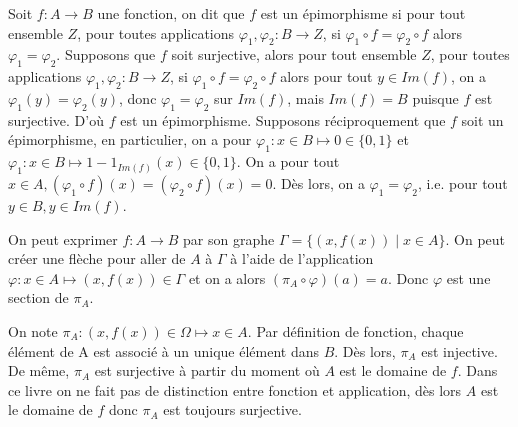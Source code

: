 \begin{exercice}
    Soit $f : A \to B$ une fonction, on dit que $f$ est un épimorphisme si pour tout ensemble $Z$, pour toutes applications $\varphi_1, \varphi_2 : B \to Z$,
    si $\varphi_1 \circ f = \varphi_2 \circ f$ alors $\varphi_1 = \varphi_2$.
    Supposons que $f$ soit surjective, alors pour tout ensemble $Z$, pour toutes applications $\varphi_1, \varphi_2 : B \to Z$, si $\varphi_1 \circ f = \varphi_2 \circ f$ alors 
    pour tout $y \in Im(f)$, on a $\varphi_1(y) = \varphi_2(y)$, donc $\varphi_1 = \varphi_2$ sur $Im(f)$, mais $Im(f) = B$ puisque $f$ est surjective. D'où $f$ est un épimorphisme. 
    Supposons réciproquement que $f$ soit un épimorphisme, en particulier, on a pour $\varphi_1 : x \in B \mapsto 0 \in \{0, 1\}$ et $\varphi_1 : x \in B \mapsto 1 - 1_{Im(f)}(x) \in \{0, 1\}$.
    On a pour tout $x \in A, (\varphi_1 \circ f)(x) = (\varphi_2 \circ f)(x) = 0$. Dès lors, on a $\varphi_1 = \varphi_2$, i.e. pour tout $y\in B, y \in Im(f)$.
\end{exercice}

\begin{exercice}
    On peut exprimer $f : A \to B$ par son graphe $\Gamma = \{(x, f(x)) \mid x \in A\}$.
    On peut créer une flèche pour aller de $A$ à $\Gamma$ à l'aide de l'application $\varphi : x \in A \mapsto (x,f(x)) \in \Gamma$ 
    et on a alors $(\pi_A \circ \varphi)(a) = a$. Donc $\varphi$ est une section de $\pi_A$.

    \begin{figure}[h]
        \centering
    \end{figure}
\end{exercice}

\begin{exercice}
    On note $\pi_A : (x, f(x)) \in \Omega \mapsto x \in A$. Par définition de fonction, chaque élément de A est 
    associé à un unique élément dans $B$. Dès lors, $\pi_A$ est injective. De même, $\pi_A$ est surjective à partir 
    du moment où $A$ est le domaine de $f$. Dans ce livre on ne fait pas de distinction entre fonction et application, 
    dès lors $A$ est le domaine de $f$ donc $\pi_A$ est toujours surjective.
\end{exercice}

